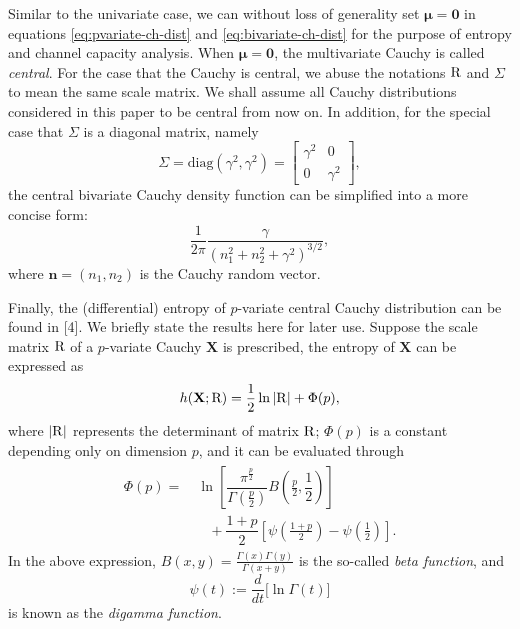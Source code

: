 \documentclass[conference]{IEEEtran}
\theoremstyle{definition}
\theoremstyle{plain}
\begin{document}
Similar to the univariate case,
we can without loss of generality set $\boldsymbol\mu=\mathbf{0}$ in equations \eqref{eq:pvariate-ch-dist} and \eqref{eq:bivariate-ch-dist} for the purpose of entropy and channel capacity analysis.
When $\boldsymbol\mu = \mathbf{0}$, the multivariate Cauchy is called \textit{central}. For the case that the Cauchy is central, we abuse the notations ${\rm R}$ and $\Sigma$ to mean the same scale matrix.
We shall assume all Cauchy distributions considered in this paper to be central from now on. In addition, for the special case that $\Sigma$ is a diagonal matrix, 
namely
\begin{equation}
\Sigma=\text{diag}(\gamma^2,\gamma^2)
=\begin{bmatrix}
\gamma^2&0\\
0&\gamma^2
\end{bmatrix},
\end{equation}
the central bivariate Cauchy density function can be simplified into a more concise form:
\begin{equation}
\dfrac{1}{2\pi}
\dfrac{\gamma}{
(n_1^2+n_2^2+\gamma^2)^{3/2}
},
\label{eq:simple-bi-ch}
\end{equation}
where $\mathbf{n}=(n_1,n_2)$ is the Cauchy random vector.

Finally, the (differential) entropy of $p$-variate central Cauchy distribution can be found in [4]. We briefly state the results here for later use. Suppose the scale matrix ${\rm R}$ of a $p$-variate Cauchy $\mathbf{X}$ is prescribed, the entropy of $\mathbf{X}$ can be expressed as
\begin{equation}
    h(\mathbf{X};{\rm R})=\dfrac{1}{2}\ln|{\rm R}|+\Phi(p),
\end{equation}
where $|{\rm R}|$ represents the determinant of matrix ${\rm R}$; $\Phi(p)$ is a constant depending only on dimension $p$, and it can be evaluated through
\begin{align}
\begin{split}
    \Phi(p)
    =&\ \ln
    \left[
    \dfrac{\pi^{\frac{p}{2}}}{\Gamma(\frac{p}{2})}B\left(\frac{p}{2},\dfrac{1}{2}\right)
    \right]\\
    &\quad +\dfrac{1+p}{2}\left[
    \psi\left(\frac{1+p}{2}\right)-\psi\left(\frac12\right)
    \right].
\end{split}
\end{align}
In the above expression, $B(x,y)=\frac{\Gamma(x)\Gamma(y)}{\Gamma(x+y)}$ is the so-called \textit{beta function}, and
\begin{equation}
\psi(t):=\dfrac{d}{dt}\big[\ln\Gamma(t)\big]   
\end{equation}
is known as the \textit{digamma function}.
\end{document}
